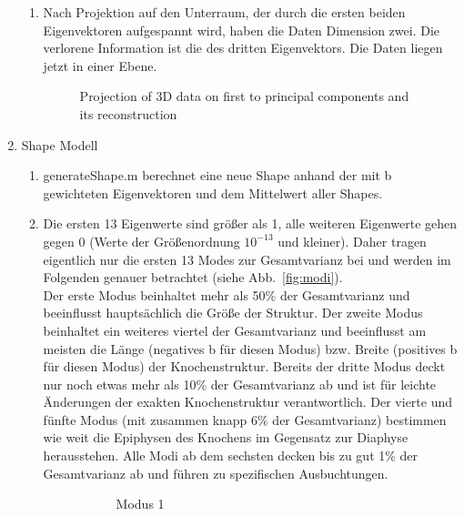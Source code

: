 \documentclass[]{report}
\newlength\figureheight
\newlength\figurewidth
\begin{document}
\begin{enumerate}
\begin{enumerate}
		\item
		Nach Projektion auf den Unterraum, der durch die ersten beiden Eigenvektoren aufgespannt wird, haben die Daten Dimension zwei. Die verlorene Information ist die des dritten Eigenvektors. Die Daten liegen jetzt in einer Ebene.
		\setlength\figureheight{10cm}
		\begin{figure}[tbp!]
			\centering
			
			\caption{Projection of 3D data on first to principal components and its reconstruction} 
			\label{fig:3D projection and reconstruction}
		\end{figure}
	\end{enumerate}
	
	\item Shape Modell
	\begin{enumerate}
		\item
		generateShape.m berechnet eine neue Shape anhand der mit b gewichteten Eigenvektoren und dem Mittelwert aller Shapes.
		\item %
		Die ersten 13 Eigenwerte sind größer als 1, alle weiteren Eigenwerte gehen gegen 0 (Werte der Größenordnung $10^{-13}$ und kleiner). Daher tragen eigentlich nur die ersten 13 Modes zur Gesamtvarianz bei und werden im Folgenden genauer betrachtet (siehe Abb.~\ref{fig:modi}).\\
		Der erste Modus beinhaltet mehr als 50\% der Gesamtvarianz und beeinflusst hauptsächlich die Größe der Struktur.
		Der zweite Modus beinhaltet ein weiteres viertel der Gesamtvarianz und beeinflusst am meisten die Länge (negatives b für diesen Modus) bzw. Breite (positives b für diesen Modus) der Knochenstruktur.
		Bereits der dritte Modus deckt nur noch etwas mehr als 10\% der Gesamtvarianz ab und ist für leichte Änderungen der exakten Knochenstruktur verantwortlich.
		Der vierte und fünfte Modus (mit zusammen knapp 6\% der Gesamtvarianz) bestimmen wie weit die Epiphysen des Knochens im Gegensatz zur Diaphyse herausstehen.
		Alle Modi ab dem sechsten decken bis zu gut 1\% der Gesamtvarianz ab und führen zu spezifischen Ausbuchtungen.
		\setlength\figureheight{4cm}
		\setlength{}
		\begin{figure}[tbp!]
			\begin{subfigure}{0.3\textwidth}
				\centering
				
				\caption{Modus 1}
				\label{fig:mode1}
			\end{subfigure}
			\quad
			\begin{subfigure}{0.3\textwidth}
				\centering

\end{subfigure}
\end{figure}
\end{enumerate}
\end{enumerate}
\end{document}
